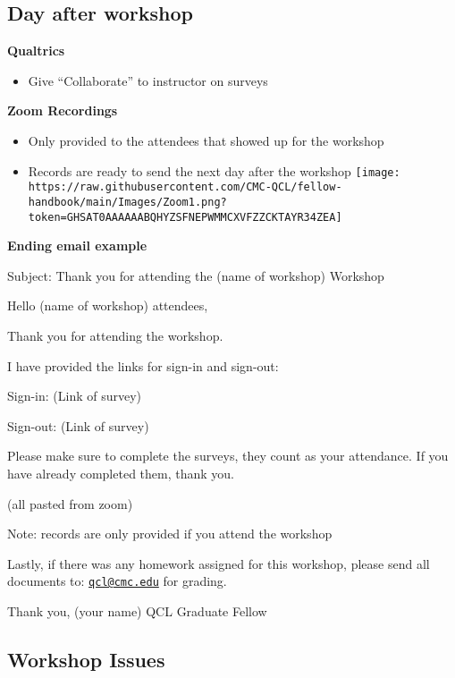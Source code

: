 \documentclass[
]{book}
\providecommand{\tightlist}{%
  \setlength{\itemsep}{0pt}\setlength{\parskip}{0pt}}
\begin{document}
\hypertarget{day-after-workshop}{%
\subsection{Day after workshop}\label{day-after-workshop}}

\textbf{Qualtrics}

\begin{itemize}
\tightlist
\item
  Give ``Collaborate'' to instructor on surveys
\end{itemize}

\textbf{Zoom Recordings}

\begin{itemize}
\tightlist
\item
  Only provided to the attendees that showed up for the workshop
\item
  Records are ready to send the next day after the workshop
  \texttt{[image: https://raw.githubusercontent.com/CMC-QCL/fellow-handbook/main/Images/Zoom1.png?token=GHSAT0AAAAAABQHYZSFNEPWMMCXVFZZCKTAYR34ZEA]}
\end{itemize}

\textbf{Ending email example}

Subject: Thank you for attending the (name of workshop) Workshop

Hello (name of workshop) attendees,

Thank you for attending the workshop.

I have provided the links for sign-in and sign-out:

Sign-in:
(Link of survey)

Sign-out:
(Link of survey)

Please make sure to complete the surveys, they count as your attendance. If you have already completed them, thank you.

(all pasted from zoom)

Note: records are only provided if you attend the workshop

Lastly, if there was any homework assigned for this workshop, please send all documents to: \href{mailto:qcl@cmc.edu}{\nolinkurl{qcl@cmc.edu}} for grading.

Thank you,
(your name)
QCL Graduate Fellow

\hypertarget{workshop-issues}{%
\subsection{Workshop Issues}\label{workshop-issues}}
\end{document}
